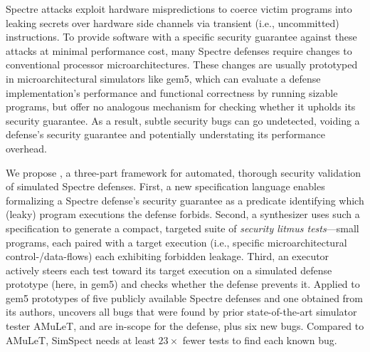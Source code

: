 Spectre attacks exploit hardware mispredictions to coerce victim programs into leaking secrets over hardware side channels via transient (i.e., uncommitted) instructions. To provide software with a specific security guarantee against these attacks at minimal performance cost, many Spectre defenses require changes to conventional processor microarchitectures. These changes are usually prototyped in microarchitectural simulators like gem5, which can evaluate a defense implementation's performance and functional correctness by running sizable programs, but offer no analogous mechanism for checking whether it upholds its security guarantee. As a result, subtle security bugs can go undetected, voiding a defense's security guarantee and potentially understating its performance overhead.

We propose \toolname{}, a three-part framework for automated, thorough security validation of simulated Spectre defenses. First, a new specification language enables formalizing a Spectre defense's security guarantee as a predicate identifying which (leaky) program executions the defense forbids. Second, a synthesizer uses such a specification to generate a compact, targeted suite of \textit{security litmus tests}---small programs, each paired with a target execution (i.e., specific microarchitectural control-/data-flows) each exhibiting forbidden leakage. Third, an executor actively steers each test toward its target execution on a simulated defense prototype (here, in gem5) and checks whether the defense prevents it. Applied to gem5 prototypes of five publicly available Spectre defenses and one obtained from its authors, \toolname{} uncovers all bugs that were found by prior state-of-the-art simulator tester AMuLeT, and are in-scope for the defense, plus six new bugs. Compared to AMuLeT, SimSpect needs at least $23\times$ fewer tests to find each known bug.



